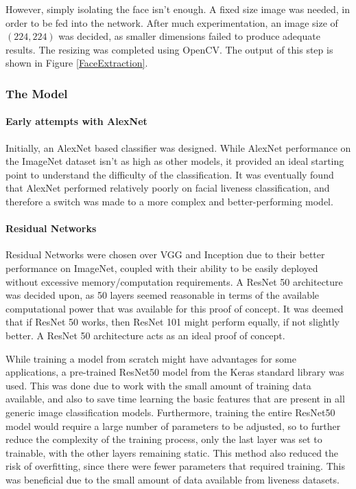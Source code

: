 \documentclass[12pt,a4paper]{article}
\begin{document}
                However, simply isolating the face isn't enough. A fixed size image was needed, in order to be fed into the network. After much experimentation, an image size of $(224, 224)$
                was decided, as smaller dimensions failed to produce adequate results. The resizing was completed using OpenCV. The output of this step is shown in Figure \ref{FaceExtraction}.

                
            \subsubsection{The Model}
               


                \paragraph{Early attempts with AlexNet}
                Initially, an AlexNet based classifier was designed. While AlexNet performance on the ImageNet dataset isn't as high as other models, it provided an ideal starting point to understand the difficulty of the classification. It was eventually found that AlexNet performed relatively poorly on facial liveness classification, and therefore a switch was made to a more complex and better-performing model.

                \paragraph{Residual Networks}
                Residual Networks were chosen over VGG and Inception due to their better performance on ImageNet, coupled with their ability to be easily deployed without excessive memory/computation requirements.
                A ResNet 50 architecture was decided upon, as 50 layers seemed reasonable in terms of the available computational power that was available for this proof of concept. It was deemed that if ResNet 50 works, then ResNet 101 might perform equally, if not slightly better. A ResNet 50 architecture acts as an ideal proof of concept.

                While training a model from scratch might have advantages for some applications, a pre-trained ResNet50 model from the Keras standard library was used. This was done due to work with the small amount of training data available, and also to save time learning the basic features that are present in all generic image classification models. Furthermore, training the entire ResNet50 model would require a large number of parameters to be adjusted, so to further reduce the complexity of the training process, only the last layer was set to trainable, with the other layers remaining static. This method also reduced the risk of overfitting, since there were fewer parameters that required training. This was beneficial due to the small amount of data available from liveness datasets.
\end{document}
